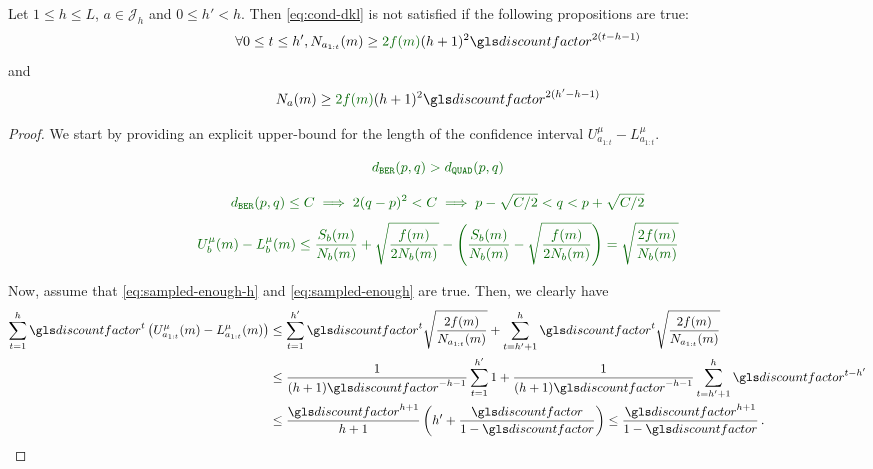 \begin{lemma}
	\label{lemma:ci-length}
	\begin{leftbar}[lemmabar]
	Let $1 \leq h \leq L$, $a\in \mathcal{J}_h$ and $0 \leq h' < h$. Then  \eqref{eq:cond-dkl} is not satisfied if the following propositions are true:
	\begin{equation}
	\label{eq:sampled-enough-h}
	\forall 0\leq t\leq h', N_{a_{1:t}}(m) \geq \diff{2f(m)}(h+1)^2\discount^{2(t-h-1)}
	\end{equation}
	and
	\begin{equation}
	\label{eq:sampled-enough}
	N_{a}(m) \geq \diff{2f(m)}(h+1)^2\discount^{2(h'-h-1)}
	\end{equation}
	\end{leftbar}
\end{lemma}
\begin{proof}
	We start by providing an explicit upper-bound for the length of the confidence interval $U^{\mu}_{a_{1:t}} - L^{\mu}_{a_{1:t}}$. 
	
	\begin{equation*}
	\diff{\dber(p, q) > \dquad(p, q)}
	\end{equation*}
	
	\begin{equation*}
	\diff{\dber(p, q) \leq C   \implies 2(q - p)^2 < C  \implies p - \sqrt{C/2} < q < p + \sqrt{C/2}}
	\end{equation*}
	\begin{align*}
	\diff{U^{\mu}_{b}(m) - L^{\mu}_{b}(m) \leq \frac{S_b(m)}{N_b(m)} + \sqrt{\frac{f(m)}{2N_b(m)}} -  \left(\frac{S_b(m)}{N_b(m)} - \sqrt{\frac{f(m)}{2N_b(m)}}\right) 
		= \sqrt{\frac{2f(m)}{N_b(m)}}}
	\end{align*}
	
	Now, assume that \eqref{eq:sampled-enough-h} and \eqref{eq:sampled-enough} are true. Then, we clearly have
	\begin{align*}
	\sum_{t=1}^h \discount^t\left(U^{\mu}_{a_{1:t}}(m) - L^{\mu}_{a_{1:t}}(m)\right) &\leq \sum_{t=1}^{h'} \discount^t \sqrt{\frac{2f(m)}{N_{a_{1:t}}(m)}} + \sum_{t=h'+1}^h \discount^t \sqrt{\frac{2f(m)}{N_{a_{1:t}}(m)}} \\
	&\leq \frac{1}{(h+1)\discount^{-h-1}} \sum_{t=1}^{h'} 1 + \frac{1}{(h+1)\discount^{-h-1}} \sum_{t=h'+1}^h \discount^{t-h'}  \\
	&\leq \frac{\discount^{h+1}}{h+1} \left( h' + \frac{\discount}{1-\discount} \right)\leq \frac{\discount^{h+1}}{1-\discount}\,.
	\end{align*}
\end{proof}

